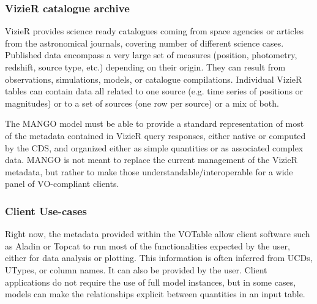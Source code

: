 

\subsubsection{VizieR catalogue archive}
VizieR provides science ready catalogues coming from space agencies or articles from the astronomical journals, covering number of different science cases.
Published data encompass a very large set of measures (position, photometry, redshift, source type, etc.)
depending on their origin.
They can result from  observations, simulations, models, or catalogue compilations.
Individual VizieR tables can contain data all related to one source (e.g. time series of positions or magnitudes) or to a set of sources (one row per source) or a mix of both.

The MANGO model must be able to provide a standard representation of most of the metadata contained 
in VizieR query responses, either native or computed by the CDS, and organized either as 
simple quantities or as associated complex data.
MANGO is not meant to replace the current management of the VizieR metadata, but rather 
to make those understandable/interoperable for a wide panel of VO-compliant clients.

\subsubsection{Client Use-cases}
Right now, the metadata provided within the VOTable allow client software such as Aladin or Topcat to run most 
of the functionalities expected by the user, either for data analysis or plotting.
This information is often inferred from UCDs, UTypes, or column names. It can also be provided by the user.
Client applications do not require the use of full model instances, but in some cases,
models can make the relationships explicit between quantities in an input table.

